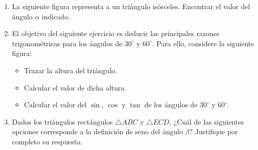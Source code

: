 \documentclass[12pt]{article}
\begin{document}
\begin{enumerate}[leftmargin=*]
\item La siguiente figura representa a un tri\'angulo is\'osceles. Encontrar el valor del \'angulo $\alpha$ indicado.\\

\begin{center}
\end{center}


\item El objetivo del siguiente ejercicio es deducir las principales razones trigonom\'etricas para los \'angulos de $30^\circ$ y $60^\circ$. Para ello, considere la siguiente figura:
\begin{center}
\end{center}
\begin{itemize}
    \item Trazar la altura del tri\'angulo.
    \item Calcular el valor de dicha altura.
    \item Calcular el valor del $\sin$, $\cos$ y $\tan$ de los \'angulos de $30^\circ$ y $60^\circ$.
\end{itemize}
    \item 
Dados los triángulos rectángulos \( \triangle ABC \) y \( \triangle ECD \). ¿Cu\'al de las siguientes opciones corresponde a la definici\'on de seno del \'angulo $\beta$?  Justifique por completo  su respuesta.
\begin{center}
    \begin{tikzpicture}


\end{tikzpicture}
\end{center}
\end{enumerate}
\end{document}
